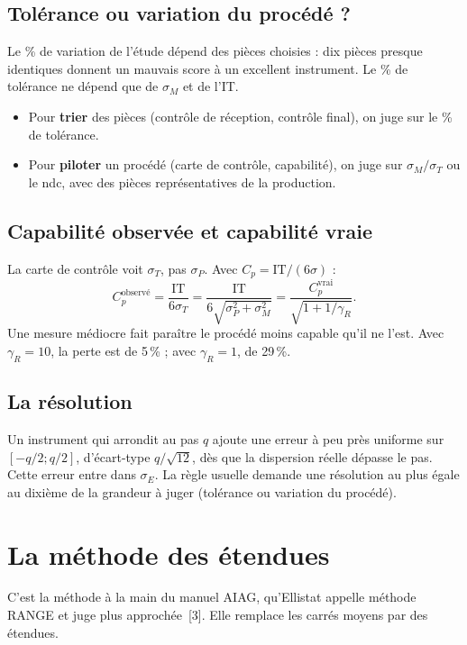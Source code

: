 \documentclass[11pt,a4paper]{article}
\theoremstyle{sj}
\theoremstyle{definition}
\theoremstyle{remark}
\providecommand{\og}{\guillemotleft\nobreakspace}
\providecommand{\fg}{\nobreakspace\guillemotright}
\newcommand{\gR}{\gamma_R}
\begin{document}
\subsection{Tolérance ou variation du procédé ?}

Le \% de variation de l'étude dépend des pièces choisies : dix pièces presque identiques donnent un mauvais score à un excellent instrument. Le \% de tolérance ne dépend que de $\sigma_M$ et de l'IT.
\begin{itemize}[leftmargin=1.4em]
\item Pour \textbf{trier} des pièces (contrôle de réception, contrôle final), on juge sur le \% de tolérance.
\item Pour \textbf{piloter} un procédé (carte de contrôle, capabilité), on juge sur $\sigma_M/\sigma_T$ ou le ndc, avec des pièces représentatives de la production.
\end{itemize}

\subsection{Capabilité observée et capabilité vraie}

La carte de contrôle voit $\sigma_T$, pas $\sigma_P$. Avec $C_p=\mathrm{IT}/(6\sigma)$ :
\[
C_p^{\text{observé}}=\frac{\mathrm{IT}}{6\sigma_T}=\frac{\mathrm{IT}}{6\sqrt{\sigma_P^2+\sigma_M^2}}=\frac{C_p^{\text{vrai}}}{\sqrt{1+1/\gR}}.
\]
Une mesure médiocre fait paraître le procédé moins capable qu'il ne l'est. Avec $\gR=10$, la perte est de 5\,\% ; avec $\gR=1$, de 29\,\%.

\subsection{La résolution}

Un instrument qui arrondit au pas $q$ ajoute une erreur à peu près uniforme sur $[-q/2;q/2]$, d'écart-type $q/\sqrt{12}$, dès que la dispersion réelle dépasse le pas. Cette erreur entre dans $\sigma_E$. La règle usuelle demande une résolution au plus égale au dixième de la grandeur à juger (tolérance ou variation du procédé).

\section{La méthode des étendues}\label{sec:etendues}

C'est la méthode \og à la main\fg{} du manuel AIAG, qu'Ellistat appelle méthode RANGE et juge \og plus approchée\fg{}~[3]. Elle remplace les carrés moyens par des étendues.
\end{document}
